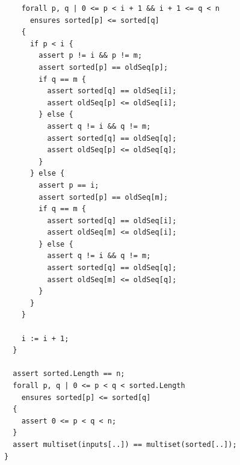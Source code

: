 \documentclass{article}
\begin{document}
\begin{lstlisting}
    forall p, q | 0 <= p < i + 1 && i + 1 <= q < n
      ensures sorted[p] <= sorted[q]
    {
      if p < i {
        assert p != i && p != m;
        assert sorted[p] == oldSeq[p];
        if q == m {
          assert sorted[q] == oldSeq[i];
          assert oldSeq[p] <= oldSeq[i];
        } else {
          assert q != i && q != m;
          assert sorted[q] == oldSeq[q];
          assert oldSeq[p] <= oldSeq[q];
        }
      } else {
        assert p == i;
        assert sorted[p] == oldSeq[m];
        if q == m {
          assert sorted[q] == oldSeq[i];
          assert oldSeq[m] <= oldSeq[i];
        } else {
          assert q != i && q != m;
          assert sorted[q] == oldSeq[q];
          assert oldSeq[m] <= oldSeq[q];
        }
      }
    }

    i := i + 1;
  }

  assert sorted.Length == n;
  forall p, q | 0 <= p < q < sorted.Length
    ensures sorted[p] <= sorted[q]
  {
    assert 0 <= p < q < n;
  }
  assert multiset(inputs[..]) == multiset(sorted[..]);
}
\end{lstlisting}
\end{document}
